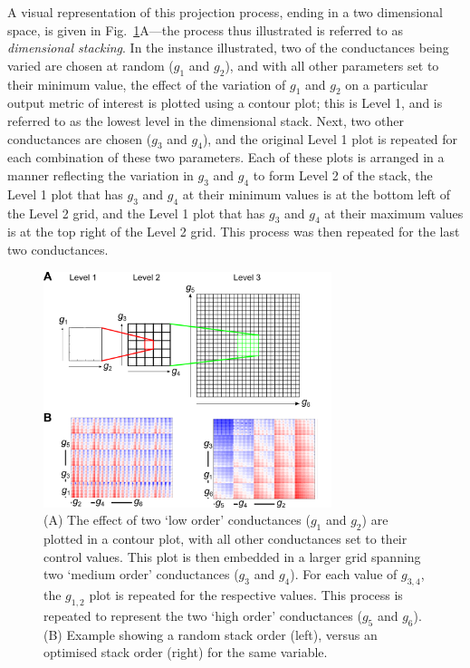 \documentclass[../thesis-main.tex]{subfiles}
\begin{document}
A visual representation of this projection process, ending in a two dimensional space, is given in Fig.~\ref{fig:dim-stack}A---the process thus illustrated is referred to as \emph{dimensional stacking}. In the instance illustrated, two of the conductances being varied are chosen at random ($g_1$ and $g_2$), and with all other parameters set to their minimum value, the effect of the variation of $g_1$ and $g_2$ on a particular output metric of interest is plotted using a contour plot; this is Level 1, and is referred to as the lowest level in the dimensional stack. Next, two other conductances are chosen ($g_3$ and $g_4$), and the original Level 1 plot is repeated for each combination of these two parameters. Each of these plots is arranged in a manner reflecting the variation in $g_3$ and $g_4$ to form Level 2 of the stack, \idest{} the Level 1 plot that has $g_3$ and $g_4$ at their minimum values is at the bottom left of the Level 2 grid, and the Level 1 plot that has $g_3$ and $g_4$ at their maximum values is at the top right of the Level 2 grid. This process was then repeated for the last two conductances.
\begin{figure}
 \centering
 \includegraphics[width=0.75\textwidth]{dimStack}
 \caption[The dimensional stacking process]{(A) The effect of two `low order' conductances ($g_1$ and $g_2$) are plotted in a contour plot, with all other conductances set to their control values. This plot is then embedded in a larger grid spanning two `medium order' conductances ($g_3$ and $g_4$). For each value of $g_{3,4}$, the $g_{1,2}$ plot is repeated for the respective values. This process is repeated to represent the two `high order' conductances ($g_5$ and $g_6$). (B) Example showing a random stack order (left), versus an optimised stack order (right) for the same variable.}
 \label{fig:dim-stack}
\end{figure}
\end{document}
